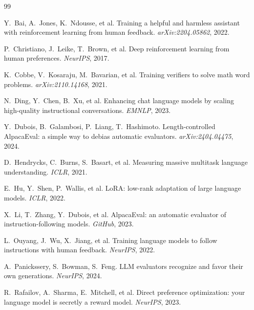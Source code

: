 \documentclass{article}
\begin{document}
\begin{thebibliography}{99}

Y.~Bai, A.~Jones, K.~Ndousse, et al.
\newblock Training a helpful and harmless assistant with reinforcement learning
from human feedback.
\newblock \emph{arXiv:2204.05862}, 2022.

P.~Christiano, J.~Leike, T.~Brown, et al.
\newblock Deep reinforcement learning from human preferences.
\newblock \emph{NeurIPS}, 2017.

K.~Cobbe, V.~Kosaraju, M.~Bavarian, et al.
\newblock Training verifiers to solve math word problems.
\newblock \emph{arXiv:2110.14168}, 2021.

N.~Ding, Y.~Chen, B.~Xu, et al.
\newblock Enhancing chat language models by scaling high-quality instructional
conversations.
\newblock \emph{EMNLP}, 2023.

Y.~Dubois, B.~Galambosi, P.~Liang, T.~Hashimoto.
\newblock Length-controlled AlpacaEval: a simple way to debias automatic
evaluators.
\newblock \emph{arXiv:2404.04475}, 2024.

D.~Hendrycks, C.~Burns, S.~Basart, et al.
\newblock Measuring massive multitask language understanding.
\newblock \emph{ICLR}, 2021.

E.~Hu, Y.~Shen, P.~Wallis, et al.
\newblock LoRA: low-rank adaptation of large language models.
\newblock \emph{ICLR}, 2022.

X.~Li, T.~Zhang, Y.~Dubois, et al.
\newblock AlpacaEval: an automatic evaluator of instruction-following models.
\newblock \emph{GitHub}, 2023.

L.~Ouyang, J.~Wu, X.~Jiang, et al.
\newblock Training language models to follow instructions with human feedback.
\newblock \emph{NeurIPS}, 2022.

A.~Panickssery, S.~Bowman, S.~Feng.
\newblock LLM evaluators recognize and favor their own generations.
\newblock \emph{NeurIPS}, 2024.

R.~Rafailov, A.~Sharma, E.~Mitchell, et al.
\newblock Direct preference optimization: your language model is secretly a
reward model.
\newblock \emph{NeurIPS}, 2023.


\end{thebibliography}
\end{document}
